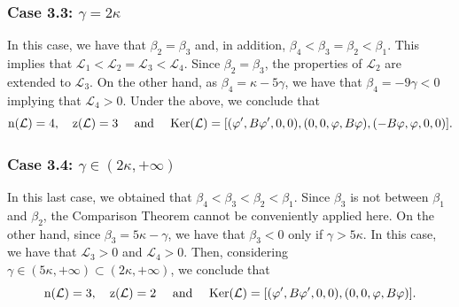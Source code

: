 \documentclass[10pt,reqno,a4paper]{amsart} %
\theoremstyle{definition} %
\numberwithin{equation}{section}
\numberwithin{figure}{section}
\begin{document}
\subsubsection*{Case 3.3: $\gamma = 2\kappa$} In this case, we have that $\beta_2 = \beta_3$ and, in addition, $\beta_4 < \beta_3 = \beta_2 < \beta_1$. This implies that $\mathcal{L}_1 < \mathcal{L}_2 = \mathcal{L}_3 < \mathcal{L}_4$. Since $\beta_2 = \beta_3$, the properties of $\mathcal{L}_2$ are extended to $\mathcal{L}_3$. On the other hand, as $\beta_4 = \kappa - 5 \gamma$, we have that $\beta_4 = - 9 \gamma < 0$ implying that $\mathcal{L}_4 > 0$. Under the above, we conclude that
\begin{equation}\label{spectralanalysis-B1-gamma2kappa}
    {\rm n}(\mathcal{L}) = 4, \quad {\rm z}(\mathcal{L}) = 3 \quad \text{ and } \quad {\rm Ker}(\mathcal{L}) = [(\varphi', B\varphi',0,0), (0,0,\varphi,B\varphi), (-B\varphi, \varphi,0,0)].
\end{equation}

\subsubsection*{Case 3.4: $\gamma \in (2\kappa, +\infty)$} In this last case, we obtained that $\beta_4 < \beta_3 < \beta_2 < \beta_1$. Since $\beta_3$ is not between $\beta_1$ and $\beta_2$, the Comparison Theorem cannot be conveniently applied here. On the other hand, since $\beta_3 = 5\kappa - \gamma$, we have that $\beta_3 < 0$ only if $\gamma > 5\kappa$. In this case, we have that $\mathcal{L}_3 > 0$ and $\mathcal{L}_4 > 0$. Then, considering $\gamma \in (5\kappa, +\infty)  \subset (2\kappa, +\infty)$, we conclude that 
\begin{equation*}%
    {\rm n}(\mathcal{L}) = 3, \quad {\rm z}(\mathcal{L}) = 2 \quad \text{ and } \quad {\rm Ker}(\mathcal{L}) = [(\varphi', B\varphi',0,0), (0,0,\varphi,B\varphi)].
\end{equation*}
\end{document}
